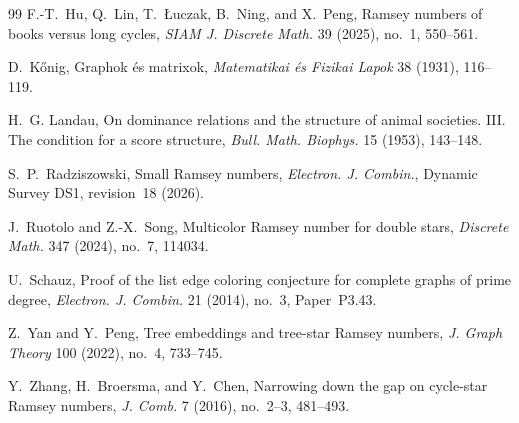 \documentclass[11pt]{article}
\theoremstyle{definition}
\theoremstyle{remark}
\begin{document}
\begin{thebibliography}{99}
F.-T.~Hu, Q.~Lin, T.~{\L}uczak, B.~Ning, and X.~Peng,
\newblock Ramsey numbers of books versus long cycles,
\newblock \emph{SIAM J. Discrete Math.} 39 (2025), no.~1, 550--561.


D.~K\H{o}nig,
\newblock Graphok \'es matrixok,
\newblock \emph{Matematikai \'es Fizikai Lapok} 38 (1931), 116--119.

\begingroup
H.~G. Landau,
\newblock On dominance relations and the structure of animal
societies. III. The condition for a score structure,
\newblock \emph{Bull. Math. Biophys.} 15 (1953), 143--148.
\endgroup



S.~P.~Radziszowski,
\newblock Small Ramsey numbers,
\newblock \emph{Electron. J. Combin.},
Dynamic Survey DS1, revision~18 (2026).

\begingroup
J.~Ruotolo and Z.-X.~Song,
\newblock Multicolor Ramsey number for double stars,
\newblock \emph{Discrete Math.} 347 (2024), no.~7, 114034.
\endgroup

\begingroup
U.~Schauz,
\newblock Proof of the list edge coloring conjecture for complete
graphs of prime degree,
\newblock \emph{Electron. J. Combin.} 21 (2014), no.~3, Paper~P3.43.
\endgroup

Z.~Yan and Y.~Peng,
\newblock Tree embeddings and tree-star Ramsey numbers,
\newblock \emph{J. Graph Theory} 100 (2022), no.~4, 733--745.

Y.~Zhang, H.~Broersma, and Y.~Chen,
\newblock Narrowing down the gap on cycle-star Ramsey numbers,
\newblock \emph{J. Comb.} 7 (2016), no.~2--3, 481--493.


\end{thebibliography}
\end{document}
